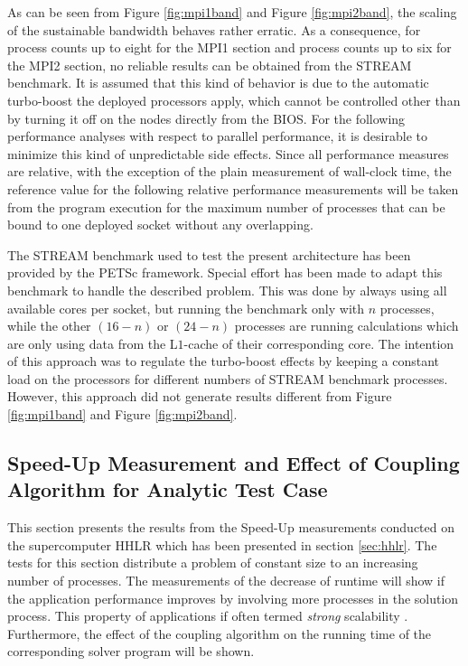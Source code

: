 As can be seen from Figure \ref{fig:mpi1band} and Figure \ref{fig:mpi2band}, the scaling of the sustainable bandwidth behaves rather erratic. As a consequence, for process counts up to eight for the MPI1 section and process counts up to six for the MPI2 section, no reliable results can be obtained from the STREAM benchmark. It is assumed that this kind of behavior is due to the automatic turbo-boost the deployed processors apply, which cannot be controlled other than by turning it off on the nodes directly from the BIOS. For the following performance analyses with respect to parallel performance, it is desirable to minimize this kind of unpredictable side effects. Since all performance measures are relative, with the exception of the plain measurement of wall-clock time, the reference value for the following relative performance measurements will be taken from the program execution for the maximum number of processes that can be bound to one deployed socket without any overlapping.

The STREAM benchmark used to test the present architecture has been provided by the PETSc framework. Special effort has been made to adapt this benchmark to handle the described problem. This was done by always using all available cores per socket, but running the benchmark only with \(n\) processes, while the other \(\left(16 - n\right)\) or \(\left(24 - n\right)\) processes are running calculations which are only using data from the L\(1\)-cache of their corresponding core. The intention of this approach was to regulate the turbo-boost effects by keeping a constant load on the processors for different numbers of STREAM benchmark processes. However, this approach did not generate results different from Figure \ref{fig:mpi1band} and Figure \ref{fig:mpi2band}.

\subsection{Speed-Up Measurement and Effect of Coupling Algorithm for Analytic Test Case}
\label{sec:speedup}

This section presents the results from the Speed-Up measurements conducted on the supercomputer HHLR which has been presented in section \ref{sec:hhlr}. The tests for this section distribute a problem of constant size to an increasing number of processes. The measurements of the decrease of runtime will show if the application performance improves by involving more processes in the solution process. This property of applications if often termed \emph{strong} scalability \cite{hager11}. Furthermore, the effect of the coupling algorithm on the running time of the corresponding solver program will be shown. 

